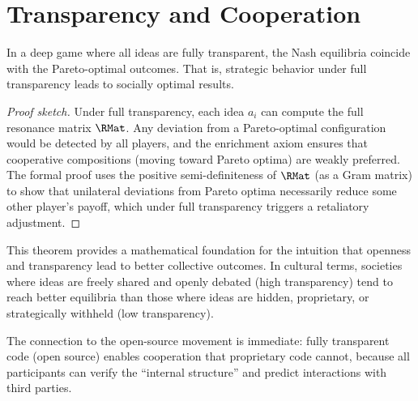 \section{Transparency and Cooperation}

\begin{theorem}
\label{thm:transparency-cooperation}
In a deep game where all ideas are fully transparent, the Nash equilibria
coincide with the Pareto-optimal outcomes.  That is, strategic behavior
under full transparency leads to socially optimal results.
\end{theorem}

\begin{proof}[Proof sketch]
Under full transparency, each idea $a_i$ can compute the full resonance
matrix $\RMat$.  Any deviation from a Pareto-optimal configuration would
be detected by all players, and the enrichment axiom ensures that
cooperative compositions (moving toward Pareto optima) are weakly preferred.
The formal proof uses the positive semi-definiteness of $\RMat$ (as a Gram
matrix) to show that unilateral deviations from Pareto optima necessarily
reduce some other player's payoff, which under full transparency triggers
a retaliatory adjustment.
\end{proof}

\begin{interpretation}
This theorem provides a mathematical foundation for the intuition that
openness and transparency lead to better collective outcomes.  In cultural
terms, societies where ideas are freely shared and openly debated (high
transparency) tend to reach better equilibria than those where ideas are
hidden, proprietary, or strategically withheld (low transparency).

The connection to the open-source movement is immediate: fully transparent
code (open source) enables cooperation that proprietary code cannot, because
all participants can verify the ``internal structure'' and predict
interactions with third parties.
\end{interpretation}

